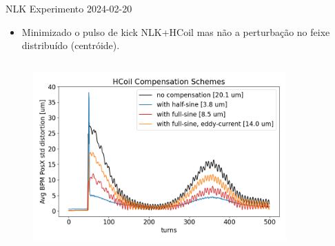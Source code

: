 \documentclass{beamer}					  %
\begin{document}
\begin{frame}{NLK}
    \vspace{0.2 cm}
    Experimento 2024-02-20
    \vspace{0.2 cm}
    \begin{itemize}
            \item Minimizado o pulso de kick NLK+HCoil mas não a perturbação no feixe distribuído (centróide).
    \end{itemize}
    \begin{columns}
        \begin{column}{0.75\textwidth}
            \begin{figure}[H]
                \centering
                \includegraphics[width=1\textwidth]{2024-03-08/figures/hcoil-compensation-scheme.png}
                \label{fig:hcoil-distortion}
            \end{figure}
        \end{column}
        \begin{column}{0.4\textwidth}
            \begin{figure}[H]
                \centering

\end{figure}
\end{column}
\end{columns}
\end{frame}
\end{document}
